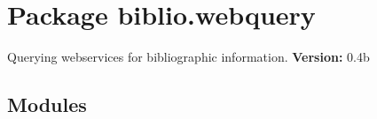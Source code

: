%
%
%


\section{Package biblio.webquery}

    \label{biblio:webquery}

Querying webservices for bibliographic information.
\textbf{Version:} 0.4b





\subsection{Modules}

